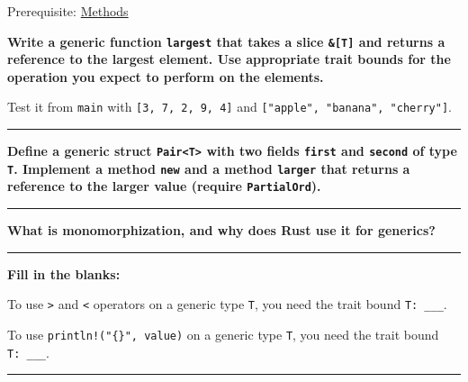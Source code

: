 \documentclass[
  11pt,
]{article}
\newenvironment{Shaded}{}{}
\begin{document}
Prerequisite: \hyperref[methods]{Methods}

\textbf{Write a generic function \texttt{largest} that takes a slice
\texttt{\&{[}T{]}} and returns a reference to the largest element. Use
appropriate trait bounds for the operation you expect to perform on the
elements.}

Test it from \texttt{main} with \texttt{{[}3,\ 7,\ 2,\ 9,\ 4{]}} and
\texttt{{[}"apple",\ "banana",\ "cherry"{]}}.

\begin{Shaded}
\begin{Highlighting}[]

\end{Highlighting}
\end{Shaded}

\begin{center}\rule{0.5\linewidth}{0.5pt}\end{center}

\textbf{Define a generic struct \texttt{Pair\textless{}T\textgreater{}}
with two fields \texttt{first} and \texttt{second} of type \texttt{T}.
Implement a method \texttt{new} and a method \texttt{larger} that
returns a reference to the larger value (require \texttt{PartialOrd}).}

\begin{Shaded}
\begin{Highlighting}[]

\end{Highlighting}
\end{Shaded}

\begin{center}\rule{0.5\linewidth}{0.5pt}\end{center}

\textbf{What is monomorphization, and why does Rust use it for
generics?}

\begin{center}\rule{0.5\linewidth}{0.5pt}\end{center}

\textbf{Fill in the blanks:}

To use \texttt{\textgreater{}} and \texttt{\textless{}} operators on a
generic type \texttt{T}, you need the trait bound \texttt{T:\ \_\_\_}.

To use \texttt{println!("\{\}",\ value)} on a generic type \texttt{T},
you need the trait bound \texttt{T:\ \_\_\_}.

\begin{center}\rule{0.5\linewidth}{0.5pt}\end{center}
\end{document}
